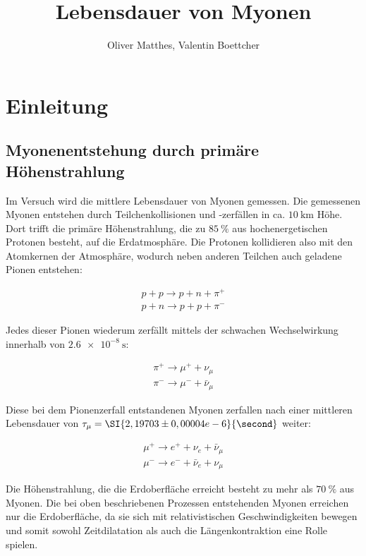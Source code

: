 \documentclass[slug=LM, room=Andreas-Schubert-Bau\,\ K\ 1A,
supervisor=Anne-Sophie\ Berthold, coursedate=13.\ 12.\ 2019]{../../Lab_Report_LaTeX/lab_report}
\title{Lebensdauer von Myonen}
\author{Oliver Matthes, Valentin Boettcher}
\begin{document}
\maketitle

\section{Einleitung}
\label{sec:einl}

\subsection{Myonenentstehung durch primäre Höhenstrahlung}
\label{sec:myonenenst}

Im Versuch wird die mittlere Lebensdauer von Myonen gemessen.
Die gemessenen Myonen entstehen durch Teilchenkollisionen und -zerfällen in ca.
\(\SI{10}{\kilo\metre}\) Höhe. Dort trifft die primäre Höhenstrahlung, die zu
\(\SI{85}{\percent}\) aus hochenergetischen Protonen besteht, auf die Erdatmosphäre.
Die Protonen kollidieren also mit den Atomkernen der Atmosphäre, wodurch neben anderen Teilchen
auch geladene Pionen entstehen:

\begin{align}\label{eq:pionen}
 p + p \rightarrow p + n + \pi^+ \\
 p + n \rightarrow p + p + \pi^- 
\end{align}

Jedes dieser Pionen wiederum zerfällt mittels der schwachen Wechselwirkung innerhalb von 
\(\SI{2,6e-8}{\second}\):

\begin{align}\label{eq:myonen}
\pi^+ \rightarrow \mu^+ + \nu_\mu \\
\pi^- \rightarrow \mu^- + \bar\nu_\mu 
\end{align}

Diese bei dem Pionenzerfall entstandenen Myonen zerfallen nach einer mittleren Lebensdauer von
\(\tau_\mu = \SI{2,19703\pm0,00004e-6}{\second}\) weiter:

\begin{align}
	\mu^+ \rightarrow e^+ + \nu_e + \bar\nu_\mu \\
	\mu^- \rightarrow e^- + \bar\nu_e + \nu_\mu
\end{align}

Die Höhenstrahlung, die die Erdoberfläche erreicht besteht zu mehr als \(\SI{70}{\percent}\)
aus Myonen. Die bei oben beschriebenen Prozessen entstehenden Myonen erreichen nur die 
Erdoberfläche, da sie sich mit relativistischen Geschwindigkeiten bewegen und somit sowohl
Zeitdilatation als auch die Längenkontraktion eine Rolle spielen.\\
\end{document}
